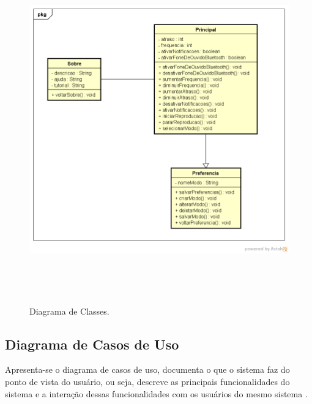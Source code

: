 \begin{figure}[H]
	\centering
	\caption[Diagrama de Classes]{Diagrama de Classes. \label{fig:diagramadeclasses}}
	\includegraphics[height=15cm]{./Figuras/class_diagram.png}%
\end{figure}

\subsection{Diagrama de Casos de Uso}

Apresenta-se o diagrama de casos de uso, documenta o que o sistema faz do ponto de vista do usu\'ario, ou seja, descreve as principais funcionalidades do sistema e a intera\c{c}\~ao dessas funcionalidades com os usu\'arios do mesmo sistema \cite{Ribeiro2012}.

